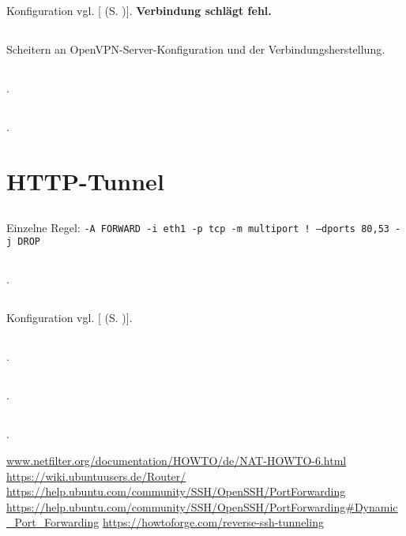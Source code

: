 \documentclass[twoside]{article}
\newcommand{\ttt}[1]{%
	\texttt{#1}%
}
\newcommand{\mref}[1]{[\nameref{#1} (S. \pageref{#1})]}
\begin{document}
	\subsection{}
	\label{ssec:5.3}
	Konfiguration vgl. \mref{a5-3}. \textbf{Verbindung schlägt fehl.}
	\subsection{}
	\label{ssec:5.4}
	Scheitern an OpenVPN-Server-Konfiguration und der Verbindungsherstellung.
	\subsection{}.
	\label{ssec:5.5}
	\subsection{}.
	\label{ssec:5.6}

\section{HTTP-Tunnel}
\label{sec:http-tunnel}
	\subsection{}
	\label{ssec:6.1}
	Einzelne Regel: \ttt{-A FORWARD -i eth1 -p tcp -m multiport ! --dports 80,53 -j DROP}
	\subsection{}.
	\label{ssec:6.2}
	\subsection{}
	\label{ssec:6.3}
	Konfiguration vgl. \mref{a6-3}.
	\subsection{}.
	\label{ssec:6.4}
	\subsection{}.
	\label{ssec:6.5}
	\subsection{}.
	\label{ssec:6.6}


\begin{thebibliography}{1}
			\url{www.netfilter.org/documentation/HOWTO/de/NAT-HOWTO-6.html}
	\url{https://wiki.ubuntuusers.de/Router/}
	\url{https://help.ubuntu.com/community/SSH/OpenSSH/PortForwarding}
	\url{https://help.ubuntu.com/community/SSH/OpenSSH/PortForwarding\#Dynamic\_Port\_Forwarding}
	\url{https://howtoforge.com/reverse-ssh-tunneling}
\end{thebibliography}
\newpage
\end{document}
